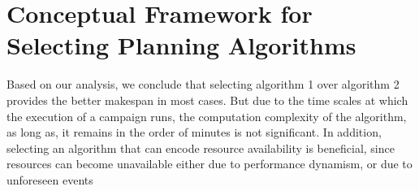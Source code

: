 %

\section{Conceptual Framework for Selecting Planning Algorithms}
\label{sec:cf_algo_sel}
Based on our analysis, we conclude that selecting algorithm 1 over algorithm 2 provides the better makespan in most cases. 
But due to the time scales at which the execution of a campaign runs, the computation complexity of the algorithm, as long as, it remains in the order of minutes is not significant.
In addition, selecting an algorithm that can encode resource availability is beneficial, since resources can become unavailable either due to performance dynamism, or due to unforeseen events